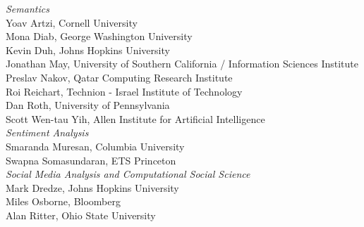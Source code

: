                             \emph{Semantics} \\
                                    \hspace*{0.2in} Yoav Artzi, Cornell University \\
                                    \hspace*{0.2in} Mona Diab, George Washington University \\
                                    \hspace*{0.2in} Kevin Duh, Johns Hopkins University \\
                                    \hspace*{0.2in} Jonathan May, University of Southern California / Information Sciences Institute \\
                                    \hspace*{0.2in} Preslav Nakov, Qatar Computing Research Institute \\
                                    \hspace*{0.2in} Roi Reichart, Technion - Israel Institute of Technology \\
                                    \hspace*{0.2in} Dan Roth, University of Pennsylvania \\
                                    \hspace*{0.2in} Scott Wen-tau Yih, Allen Institute for Artificial Intelligence \\
                            \emph{Sentiment Analysis} \\
                                    \hspace*{0.2in} Smaranda Muresan, Columbia University \\
                                    \hspace*{0.2in} Swapna Somasundaran, ETS Princeton \\
                            \emph{Social Media Analysis and Computational Social Science} \\
                                    \hspace*{0.2in} Mark Dredze, Johns Hopkins University \\
                                    \hspace*{0.2in} Miles Osborne, Bloomberg \\
                                    \hspace*{0.2in} Alan Ritter, Ohio State University \\
